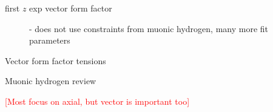 \begin{description}
\item[first $z$ exp vector form factor] \cite{Ye:2017gyb}
 - does not use constraints from muonic hydrogen, many more fit parameters
\item[Vector form factor tensions] \cite{Borah:2020gte}
\item[Muonic hydrogen review] \cite{Hill:2017wgb}
\end{description}

\textcolor{red}{[Most focus on axial, but vector is important too]}
